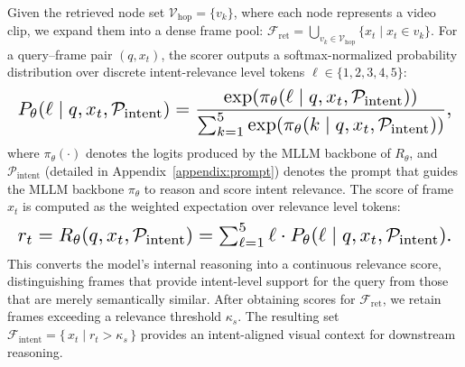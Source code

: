 {Given the retrieved node set $\mathcal{V}_{\text{hop}} = \{ v_k \}$,  where each node represents a video clip, we expand them into a dense frame pool: $\mathcal{F}_{\text{ret}} = 
\bigcup_{v_k \in \mathcal{V}_{\text{hop}}} 
\{ x_t \mid x_t \in v_k \}$. For a query–frame pair $(q, x_t)$, the scorer outputs a softmax-normalized probability distribution over discrete intent-relevance level tokens $\ell \in \{1,2,3,4,5\}$:
\begin{equation}
\resizebox{\linewidth}{!}{$\displaystyle
P_{\theta}(\ell \mid q, x_t, \mathcal{P}_{\text{intent}})
= \frac{\exp(\pi_{\theta}(\ell \mid q, x_t, \mathcal{P}_{\text{intent}}))}
{\sum_{k=1}^{5}\exp(\pi_{\theta}(k \mid q, x_t, \mathcal{P}_{\text{intent}}))},
$}
\end{equation}
where $\pi_{\theta}(\cdot)$ denotes the logits produced by the MLLM backbone of $R_{\theta}$, and $\mathcal{P}_{\text{intent}}$ (detailed in Appendix~\ref{appendix:prompt}) denotes the prompt that guides the MLLM backbone $\pi_\theta$ to reason and score intent relevance. The score of frame $x_t$ is computed as the weighted expectation over relevance level tokens:
\begin{equation}
\resizebox{\linewidth}{!}{$r_t = R_{\theta}(q, x_t,\mathcal{P}_{\text{intent}}) = \sum_{\ell=1}^{5} \ell \cdot P_{\theta}(\ell \mid q, x_t,\mathcal{P}_{\text{intent}}).
$}
\end{equation}
This converts the model’s internal reasoning into a continuous relevance score, distinguishing frames that provide intent-level support for the query from those that are merely semantically similar. After obtaining scores for $\mathcal{F}_{\text{ret}}$, 
we retain frames exceeding a relevance threshold $\kappa_s$. 
The resulting set $\mathcal{F}_{\text{intent}} =
\{\, x_t \mid r_t > \kappa_s \,\}$ provides an intent-aligned visual context for downstream reasoning.

}
